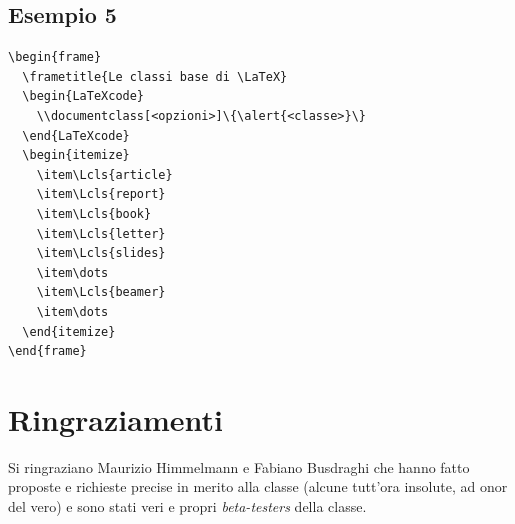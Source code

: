 \documentclass[a4paper,10pt]{article}
\begin{document}
\subsection*{Esempio 5}\label{ex5}
\begin{Verbatim}
\begin{frame}
  \frametitle{Le classi base di \LaTeX}
  \begin{LaTeXcode}
    \\documentclass[<opzioni>]\{\alert{<classe>}\}
  \end{LaTeXcode}
  \begin{itemize}
    \item\Lcls{article}
    \item\Lcls{report}
    \item\Lcls{book}
    \item\Lcls{letter}
    \item\Lcls{slides}
    \item\dots
    \item\Lcls{beamer}
    \item\dots
  \end{itemize}
\end{frame}
\end{Verbatim}

\bigskip
\begin{center}
\end{center}

\newpage
\section{Ringraziamenti}\label{sec:acknow}
Si ringraziano Maurizio Himmelmann e Fabiano Busdraghi che hanno fatto
proposte e richieste precise in merito alla classe (alcune tutt'ora
insolute, ad onor del vero) e sono stati veri e propri
\textit{beta-testers} della classe.
\end{document}
